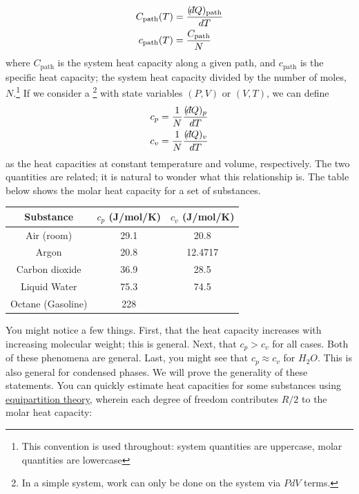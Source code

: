 \documentclass[12pt]{article}
\def\dbar{{\mathchar'26\mkern-12mu d}}
\begin{document}
\begin{align*}
C_\text{path} (T) &= \frac{(\dbar Q)_\text{path}}{dT}\\
c_\text{path} (T) &= \frac{C_\text{path}}{N} %
\end{align*}
where $C_\text{path}$ is the system heat capacity along a given path, and $c_\text{path}$ is the specific heat capacity; the system heat capacity divided by the number of moles, $N$.\footnote{This convention is used throughout: system quantities are uppercase, molar quantities are lowercase}   If we consider a \footnote{In a simple system, work can only be done on the system via $PdV$ terms.} with state variables $(P,V)$ or $(V,T)$, we can define
\begin{align*}
c_p &= \frac{1}{N} \frac{(\dbar Q)_p}{dT}\\
c_v &=  \frac{1}{N} \frac{(\dbar Q)_v}{dT}
\end{align*}
as the heat capacities at constant temperature and volume, respectively. The two quantities are related; it is natural to wonder what this relationship is. %
The table below shows the molar heat capacity for a set of substances.
\begin{center}
\begin{tabular}{ c|c|c } 
 Substance & $c_p$ (J/mol/K)& $c_v$ (J/mol/K) \\ 
 \hline
 Air (room) & 29.1 & 20.8 \\ 
 Argon & 20.8 & 12.4717 \\ 
 Carbon dioxide & 36.9 & 28.5\\
 Liquid Water & 75.3 & 74.5\\
 Octane (Gasoline) & 228 &  \\
\end{tabular}
\end{center}

You might notice a few things. First, that the heat capacity increases with increasing molecular weight; this is general. Next, that $c_p > c_v$ for all cases. Both of these phenomena are general. Last, you might see that $c_p \approx c_v$ for $H_2O$. This is also general for condensed phases. We will prove the generality of these statements. %
You can quickly estimate heat capacities for some substances using \href{http://en.wikipedia.org/wiki/Equipartition_theorem}{equipartition theory}, wherein each degree of freedom contributes $R/2$ to the molar heat capacity:
\end{document}
